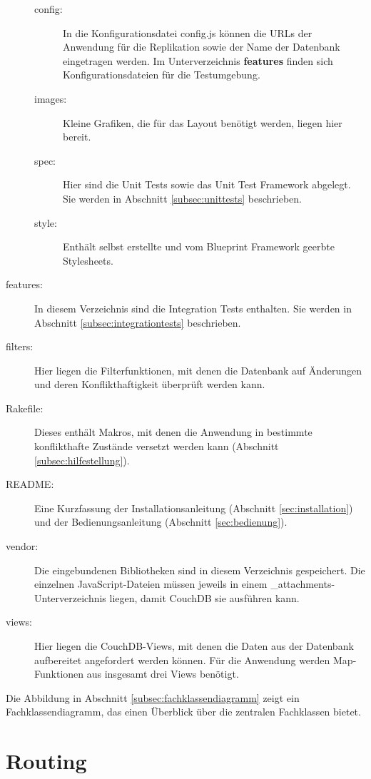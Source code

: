 \begin{description}
\begin{description}
      \item[config:] In die Konfigurationsdatei {\selectfont config.js} können die URLs der Anwendung für die Replikation sowie der Name der Datenbank eingetragen werden. Im Unterverzeichnis \textbf{features} finden sich Konfigurationsdateien für die Testumgebung.
      \item[images:] Kleine Grafiken, die für das Layout benötigt werden, liegen hier bereit.
      \item[spec:] Hier sind die Unit Tests sowie das Unit Test Framework abgelegt. Sie werden in Abschnitt \ref{subsec:unittests} beschrieben.
      \item[style:] Enthält selbst erstellte und vom Blueprint Framework geerbte Stylesheets.
    \end{description}
  
  \item[features:] In diesem Verzeichnis sind die Integration Tests enthalten. Sie werden in Abschnitt \ref{subsec:integrationtests} beschrieben.
  \item[filters:] Hier liegen die Filterfunktionen, mit denen die Datenbank auf Änderungen und deren Konflikthaftigkeit überprüft werden kann.
  \item[Rakefile:] Dieses enthält Makros, mit denen die Anwendung in bestimmte konflikthafte Zustände versetzt werden kann (Abschnitt \ref{subsec:hilfestellung}).
  \item[README:] Eine Kurzfassung der Installationsanleitung (Abschnitt \ref{sec:installation}) und der Bedienungsanleitung (Abschnitt \ref{sec:bedienung}).
  \item[vendor:] Die eingebundenen Bibliotheken sind in diesem Verzeichnis gespeichert. Die einzelnen JavaScript-Dateien müssen jeweils in einem {\selectfont \_attachments}-Unterverzeichnis liegen, damit CouchDB sie ausführen kann.
  \item[views:] Hier liegen die CouchDB-Views, mit denen die Daten aus der Datenbank aufbereitet angefordert werden können. Für die Anwendung werden Map-Funktionen aus insgesamt drei Views benötigt. 
\end{description}


Die Abbildung in Abschnitt \ref{subsec:fachklassendiagramm} zeigt ein Fachklassendiagramm, das einen Überblick über die zentralen Fachklassen bietet.




\section{Routing}
\label{subsec:routes}

